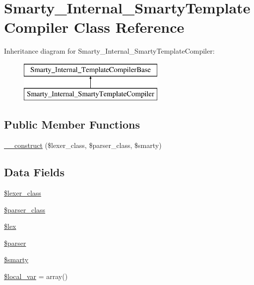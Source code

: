 \hypertarget{class_smarty___internal___smarty_template_compiler}{}\section{Smarty\+\_\+\+Internal\+\_\+\+Smarty\+Template\+Compiler Class Reference}
\label{class_smarty___internal___smarty_template_compiler}
Inheritance diagram for Smarty\+\_\+\+Internal\+\_\+\+Smarty\+Template\+Compiler\+:\begin{figure}[H]
\begin{center}
\leavevmode
\includegraphics[height=2.000000cm]{class_smarty___internal___smarty_template_compiler}
\end{center}
\end{figure}
\subsection*{Public Member Functions}
\begin{DoxyCompactItemize}
\item 
\hyperlink{class_smarty___internal___smarty_template_compiler_ac3b6ac0fa775cd557be8b4b8a3828e25}{\+\_\+\+\_\+construct} (\$lexer\+\_\+class, \$parser\+\_\+class, \$smarty)
\end{DoxyCompactItemize}
\subsection*{Data Fields}
\begin{DoxyCompactItemize}
\item 
\hyperlink{class_smarty___internal___smarty_template_compiler_af215b21add74b95d21b402333ab504b6}{\$lexer\+\_\+class}
\item 
\hyperlink{class_smarty___internal___smarty_template_compiler_aa3da13f362db73ada9406721f42401ab}{\$parser\+\_\+class}
\item 
\hyperlink{class_smarty___internal___smarty_template_compiler_aca825068998c07781f4d7cbfe46b86a2}{\$lex}
\item 
\hyperlink{class_smarty___internal___smarty_template_compiler_a147a766daa03d52576c7345fea31c945}{\$parser}
\item 
\hyperlink{class_smarty___internal___smarty_template_compiler_ac3ae29e9ccbb2006fa26fd9eb2c12117}{\$smarty}
\item 
\hyperlink{class_smarty___internal___smarty_template_compiler_a329421d447976dcf123c1a9203e74cda}{\$local\+\_\+var} = array()
\end{DoxyCompactItemize}
